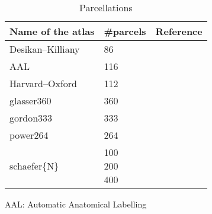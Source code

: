 \renewcommand\cellset{\renewcommand\arraystretch{0.5}%
    \setlength\extrarowheight{0pt}}
\begin{table}[bt]
    \scriptsize
    \begin{threeparttable}
        \begin{subtable}[t]{.525\textwidth}
            \label{tab:parcellations2}
            \begin{tabularx}{\textwidth}{l l l}
                \toprule
                \textbf{Name of the atlas}  & \textbf{\#parcels}                                  & \textbf{Reference}          \\
                \midrule
                Desikan--Killiany           & \num{86}                                            & \cite{desikan2006automated} \\
                AAL                         & \num{116}                                           & \cite{tzourio2002automated} \\
                Harvard--Oxford             & \num{112}                                           & \cite{makris2006decreased}  \\
                glasser360                  & \num{360}                                           & \cite{Glasser2016-ia}       \\
                gordon333                   & \num{333}                                           & \cite{Gordon2016-wy}        \\
                power264                    & \num{264}                                           & \cite{Power2011-xf}         \\
                schaefer\{N\}               & \makecell[lt]{\num{100} \\ \num{200}\\ \num{400}}   & \cite{Schaefer2018-bo}      \\
                \bottomrule
            \end{tabularx}
            \begin{tablenotes}
                \item{AAL:} Automatic Anatomical Labelling
            \end{tablenotes}
            \caption{Parcellations}
        \end{subtable}
        \qquad
        \begin{subtable}[t]{.425\textwidth}
            \label{tab:parcellations}

\end{subtable}
\end{threeparttable}
\end{table}
